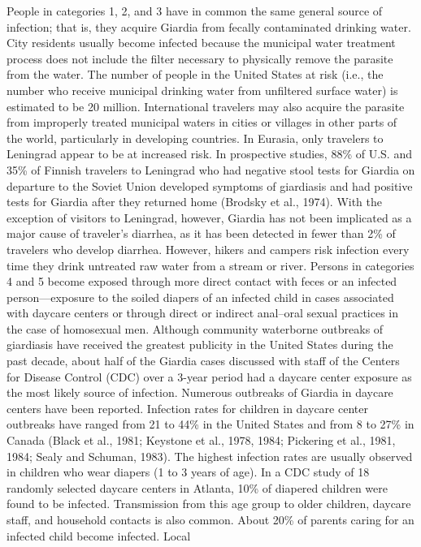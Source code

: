 \documentclass{article}
\begin{document}
People in categories 1, 2, and 3 have in common the same general source
of infection; that is, they acquire Giardia from fecally contaminated
drinking water. City residents usually become infected because the
municipal water treatment process does not include the filter necessary
to physically remove the parasite from the water. The number of people
in the United States at risk (i.e., the number who receive municipal
drinking water from unfiltered surface water) is estimated to be 20
million. International travelers may also acquire the parasite from
improperly treated municipal waters in cities or villages in other parts
of the world, particularly in developing countries. In Eurasia, only
travelers to Leningrad appear to be at increased risk. In prospective
studies, 88\% of U.S. and 35\% of Finnish travelers to Leningrad who had
negative stool tests for Giardia on departure to the Soviet Union
developed symptoms of giardiasis and had positive tests for Giardia
after they returned home (Brodsky et al., 1974). With the exception of
visitors to Leningrad, however, Giardia has not been implicated as a
major cause of traveler's diarrhea, as it has been detected in fewer
than 2\% of travelers who develop diarrhea. However, hikers and campers
risk infection every time they drink untreated raw water from a stream
or river. Persons in categories 4 and 5 become exposed through more
direct contact with feces or an infected person---exposure to the soiled
diapers of an infected child in cases associated with daycare centers or
through direct or indirect anal--oral sexual practices in the case of
homosexual men. Although community waterborne outbreaks of giardiasis
have received the greatest publicity in the United States during the
past decade, about half of the Giardia cases discussed with staff of the
Centers for Disease Control (CDC) over a 3-year period had a daycare
center exposure as the most likely source of infection. Numerous
outbreaks of Giardia in daycare centers have been reported. Infection
rates for children in daycare center outbreaks have ranged from 21 to
44\% in the United States and from 8 to 27\% in Canada (Black et al.,
1981; Keystone et al., 1978, 1984; Pickering et al., 1981, 1984; Sealy
and Schuman, 1983). The highest infection rates are usually observed in
children who wear diapers (1 to 3 years of age). In a CDC study of 18
randomly selected daycare centers in Atlanta, 10\% of diapered children
were found to be infected. Transmission from this age group to older
children, daycare staff, and household contacts is also common. About
20\% of parents caring for an infected child become infected. Local
\end{document}
